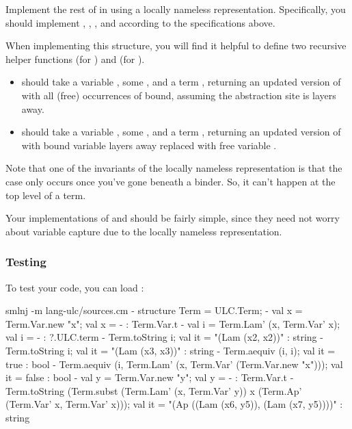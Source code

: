 \documentclass[11pt]{article}
\begin{document}
\begin{task}{40}
  Implement the rest of  in  using a locally nameless representation.
  Specifically, you should implement , , , and  according to the specifications above.
\end{task}
\begin{hint}
  When implementing this structure, you will find it helpful to define two recursive helper functions  (for ) and  (for ).
  \begin{itemize}
    \item
       should take a variable , some , and a term , returning an updated version of  with all (free) occurrences of  bound, assuming the abstraction site is  layers away.

    \item
       should take a variable , some , and a term , returning an updated version of  with bound variable  layers away replaced with free variable .
  \end{itemize}
\end{hint}
\begin{hint}
  Note that one of the invariants of the locally nameless representation is that the case  only occurs once you've gone beneath a binder.
  So, it can't happen at the top level of a term.
\end{hint}
\begin{hint}
  Your implementations of  and  should be fairly simple, since they need not worry about variable capture due to the locally nameless representation.
\end{hint}

\subsubsection*{Testing}
To test your code, you can load :
\begin{codeblock}
  smlnj -m lang-ulc/sources.cm
  - structure Term = ULC.Term;
  - val x = Term.Var.new "x";
  val x = - : Term.Var.t
  - val i = Term.Lam' (x, Term.Var' x);
  val i = - : ?.ULC.term
  - Term.toString i;
  val it = "(Lam (x2, x2))" : string
  - Term.toString i;
  val it = "(Lam (x3, x3))" : string
  - Term.aequiv (i, i);
  val it = true : bool
  - Term.aequiv (i, Term.Lam' (x, Term.Var' (Term.Var.new "x")));
  val it = false : bool
  - val y = Term.Var.new "y";
  val y = - : Term.Var.t
  - Term.toString (Term.subst (Term.Lam' (x, Term.Var' y)) x (Term.Ap' (Term.Var' x, Term.Var' x)));
  val it = "(Ap ((Lam (x6, y5)), (Lam (x7, y5))))" : string
\end{codeblock}
\end{document}
